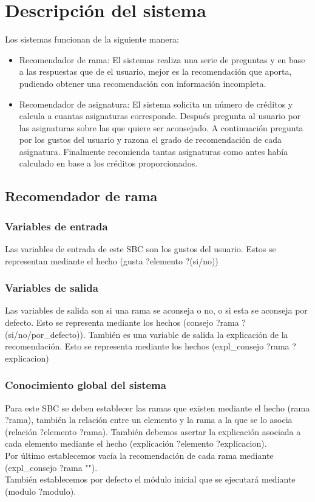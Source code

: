 \chapter{Descripción del sistema}
Los sistemas funcionan de la siguiente manera:
\begin{itemize}
   \item Recomendador de rama: El sistemas realiza una serie de preguntas y en base a las respuestas que de el usuario, mejor es la recomendación que aporta, pudiendo obtener una recomendación con información incompleta.
   \item Recomendador de asignatura: El sistema solicita un número de créditos y calcula a cuantas asignaturas corresponde. Después pregunta al usuario por las asignaturas sobre las que quiere ser aconsejado. A continuación pregunta por los gustos del usuario y razona el grado de recomendación de cada asignatura. Finalmente recomienda tantas asignaturas como antes había calculado en base a los créditos proporcionados.
\end{itemize}
\section{Recomendador de rama}
\subsection{Variables de entrada}
Las variables de entrada de este SBC son los gustos del usuario. Estos se representan mediante el hecho (gusta ?elemento ?(si/no))
\subsection{Variables de salida}
Las variables de salida son si una rama se aconseja o no, o si esta se aconseja por defecto. Esto se representa mediante los hechos (consejo ?rama ?(si/no/por\_defecto)). También es una variable de salida la explicación de la recomendación. Esto se representa mediante los hechos (expl\_consejo ?rama ?explicacion)
\subsection{Conocimiento global del sistema}
Para este SBC se deben establecer las ramas que existen mediante el hecho (rama ?rama), también la relación entre un elemento y la rama a la que se lo asocia (relación ?elemento ?rama). También debemos asertar la explicación asociada a cada elemento mediante el hecho (explicación ?elemento ?explicacion).\\
Por último establecemos vacía la recomendación de cada rama mediante (expl\_consejo ?rama "").\\
También establecemos por defecto el módulo inicial que se ejecutará mediante (modulo ?modulo).
